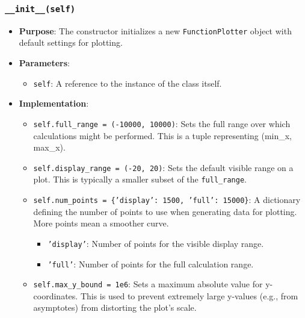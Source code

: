 \documentclass[12pt,a4paper]{report}
\begin{document}
\subsubsection{\texttt{\_\_init\_\_(self)}}
\begin{itemize}
    \item \textbf{Purpose}: The constructor initializes a new \texttt{FunctionPlotter} object with default settings for plotting.
    \item \textbf{Parameters}:
        \begin{itemize}
            \item \texttt{self}: A reference to the instance of the class itself.
        \end{itemize}
    \item \textbf{Implementation}:
        \begin{itemize}
            \item \texttt{self.full\_range = (-10000, 10000)}: Sets the full range over which calculations might be performed. This is a tuple representing (min\_x, max\_x).
            \item \texttt{self.display\_range = (-20, 20)}: Sets the default visible range on a plot. This is typically a smaller subset of the \texttt{full\_range}.
            \item \texttt{self.num\_points = \{'display': 1500, 'full': 15000\}}: A dictionary defining the number of points to use when generating data for plotting. More points mean a smoother curve.
                \begin{itemize}
                    \item \texttt{'display'}: Number of points for the visible display range.
                    \item \texttt{'full'}: Number of points for the full calculation range.
                \end{itemize}
            \item \texttt{self.max\_y\_bound = 1e6}: Sets a maximum absolute value for y-coordinates. This is used to prevent extremely large y-values (e.g., from asymptotes) from distorting the plot's scale.
        \end{itemize}
\end{itemize}
\end{document}
